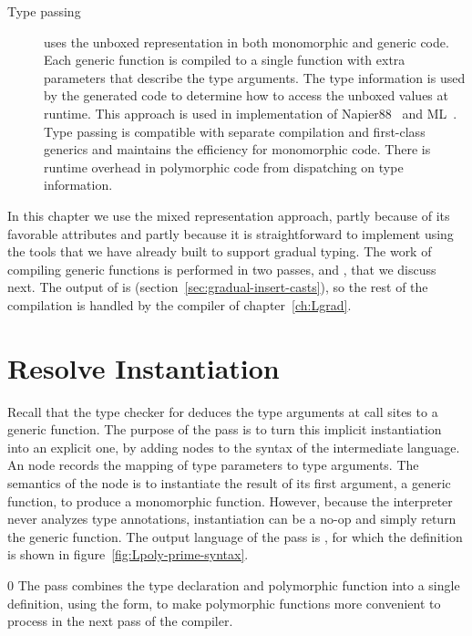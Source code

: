 \documentclass[7x10]{TimesAPriori_MIT}%
\def\racketEd{0}
\def\edition{1}
\numberwithin{theorem}{chapter}
\numberwithin{definition}{chapter}
\numberwithin{equation}{chapter}
\begin{document}
\begin{description}
\item[Type passing] uses the unboxed representation in both
  monomorphic and generic code. Each generic function is compiled to a
  single function with extra parameters that describe the type
  arguments. The type information is used by the generated code to
  determine how to access the unboxed values at runtime. This approach is
  used in implementation of Napier88~\citep{Morrison:1991aa} and
  ML~\citep{Harper:1995um}.  Type passing is compatible with separate
  compilation and first-class generics and maintains the
  efficiency for monomorphic code. There is runtime overhead in
  polymorphic code from dispatching on type information.
\end{description}

In this chapter we use the mixed representation approach, partly
because of its favorable attributes and partly because it is
straightforward to implement using the tools that we have already
built to support gradual typing. The work of compiling generic
functions is performed in two passes,  and
, that we discuss next. The output of
 is \LangCast{}
(section~\ref{sec:gradual-insert-casts}), so the rest of the
compilation is handled by the compiler of chapter~\ref{ch:Lgrad}.

\section{Resolve Instantiation}
\label{sec:generic-resolve}

Recall that the type checker for \LangPoly{} deduces the type
arguments at call sites to a generic function. The purpose of the
 pass is to turn this implicit instantiation into an
explicit one, by adding  nodes to the syntax of the
intermediate language.  An  node records the mapping of
type parameters to type arguments. The semantics of the 
node is to instantiate the result of its first argument, a generic
function, to produce a monomorphic function. However, because the
interpreter never analyzes type annotations, instantiation can be a
no-op and simply return the generic function.
%
The output language of the  pass is \LangInst{},
for which the definition is shown in figure~\ref{fig:Lpoly-prime-syntax}.

{\if\edition\racketEd    
The  pass combines the type declaration and polymorphic
function into a single definition, using the  form, to make
polymorphic functions more convenient to process in the next pass of the
compiler.
\fi}
\end{document}

